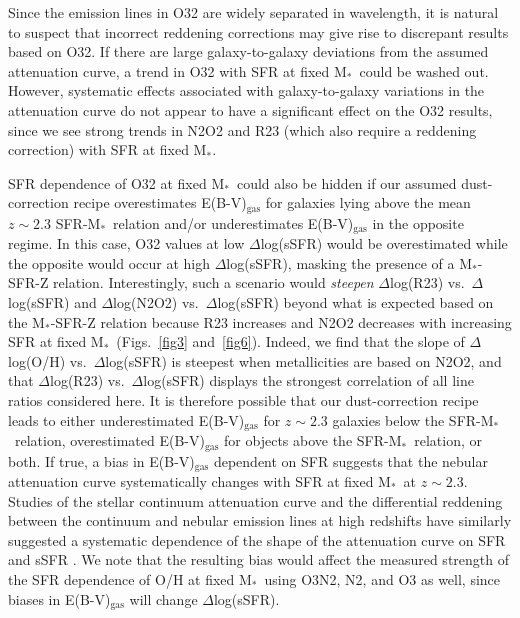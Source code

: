 \documentclass[iop,twocolappendix]{emulateapj}
\newcommand{\mstar}{$\mbox{M}_*$}
\begin{document}
Since the emission lines in O32 are widely separated in wavelength, it is natural to suspect
 that incorrect reddening corrections may give rise to discrepant results based on O32.
  If there are large
 galaxy-to-galaxy deviations from the assumed \citet{car89} attenuation curve, a trend in O32
 with SFR at fixed \mstar\ could be washed out.  
  However, systematic effects associated with galaxy-to-galaxy variations in the attenuation curve
 do not appear to have a significant effect on the O32 results, since we see strong trends in N2O2 and R23
 (which also require a reddening correction) with SFR at fixed \mstar.

  SFR dependence of O32 at fixed \mstar\ could also be hidden if our assumed dust-correction recipe
 overestimates E(B-V)$_{\text{gas}}$ for galaxies lying above the mean $z\sim2.3$ SFR-\mstar\ relation
 and/or underestimates E(B-V)$_{\text{gas}}$ in the opposite regime.
   In this case, O32 values at low $\Delta$log(sSFR)
 would be overestimated while the opposite would occur at high $\Delta$log(sSFR), masking the presence of
 a \mstar-SFR-Z relation. 
  Interestingly, such a scenario would \textit{steepen} $\Delta$log(R23) vs.~$\Delta$log(sSFR) and
 $\Delta$log(N2O2) vs.~$\Delta$log(sSFR) beyond what is expected based on the \mstar-SFR-Z relation because
 R23 increases and N2O2 decreases with increasing SFR at fixed \mstar\ (Figs.~\ref{fig3} and~\ref{fig6}).
  Indeed, we find that the slope of $\Delta$log(O/H) vs.~$\Delta$log(sSFR) is steepest
 when metallicities are based on N2O2, and that $\Delta$log(R23) vs.~$\Delta$log(sSFR) displays
 the strongest correlation of all line ratios considered here.
  It is therefore possible that our dust-correction recipe
 leads to either underestimated E(B-V)$_{\text{gas}}$ for $z\sim2.3$ galaxies below the SFR-\mstar\ relation,
 overestimated E(B-V)$_{\text{gas}}$ for objects above the SFR-\mstar\ relation, or both.
  If true, a bias in E(B-V)$_{\text{gas}}$ dependent on SFR suggests that the nebular attenuation curve
 systematically changes with SFR at fixed \mstar\ at $z\sim2.3$.
  Studies of the stellar continuum attenuation curve and the differential reddening between the continuum
 and nebular emission lines at high redshifts have similarly suggested a systematic dependence of the shape of the attenuation
 curve on SFR and sSFR \citep{kri13,pri14,red15}.
  We note that the resulting bias would affect the measured strength of the SFR dependence of O/H at fixed
 \mstar\ using O3N2, N2, and O3 as well, since biases in E(B-V)$_{\text{gas}}$ will change $\Delta$log(sSFR).
\end{document}
